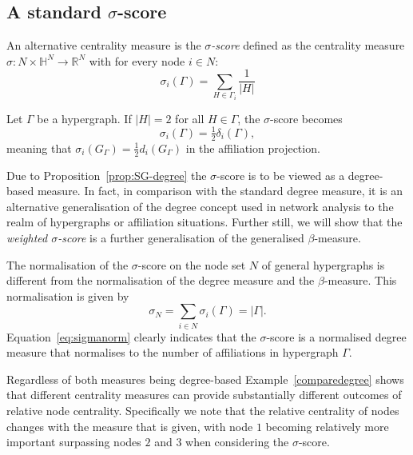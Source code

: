 \subsection{A standard $\sigma$-score}

An alternative centrality measure is the \emph{$\sigma$-score} defined as the centrality measure $\sigma \colon N \times \mathbb{H}^N \to \mathbb{R}^N$ with for every node $i \in N \colon$
\begin{equation}
\sigma_i (\Gamma ) = \sum_{H \in \Gamma_i} \frac{1}{|H|}
\end{equation}
\begin{proposition} \label{prop:SG-degree}
Let $\Gamma$ be a hypergraph. If $| H | = 2$ for all $H \in \Gamma$, the $\sigma$-score becomes
\begin{equation}
\sigma_i (\Gamma ) = \tfrac{1}{2} \delta_i ( \Gamma ) ,
\end{equation}
meaning that $\sigma_{i}(G_{\Gamma}) = \tfrac{1}{2} d_{i} (G_{\Gamma})$ in the affiliation projection.
\end{proposition}
Due to Proposition~\ref{prop:SG-degree} the $\sigma$-score is to be viewed as a degree-based measure. In fact, in comparison with the standard degree measure, it is an alternative generalisation of the degree concept used in network analysis to the realm of hypergraphs or affiliation situations. Further still, we will show that the \emph{weighted $\sigma$-score} is a further generalisation of the generalised $\beta$-measure.

The normalisation of the $\sigma$-score on the node set $N$ of general hypergraphs is different from the normalisation of the degree measure and the $\beta$-measure. This normalisation is given by
\begin{equation} \label{eq:sigmanorm}
\sigma_{N} = \sum_{i \in N} \sigma_i (\Gamma ) = | \Gamma | .
\end{equation}
Equation~\ref{eq:sigmanorm} clearly indicates that the $\sigma$-score is a normalised degree measure that normalises to the number of affiliations in hypergraph $\Gamma$.

Regardless of both measures being degree-based Example~\ref{comparedegree} shows that different centrality measures can provide substantially different outcomes of relative node centrality. Specifically we note that the relative centrality of nodes changes with the measure that is given, with node $1$ becoming relatively more important surpassing nodes $2$ and $3$ when considering the $\sigma$-score.

